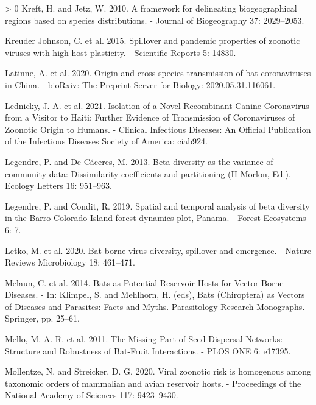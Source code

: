 \documentclass[11pt]{article}
\newlength{\cslhangindent}
\newenvironment{CSLReferences}[3] %
 {%
  \setlength{\parindent}{0pt}
  \ifodd #1 \everypar{\setlength{\hangindent}{\cslhangindent}}\ignorespaces\fi
  \ifnum #2 > 0
  \setlength{\parskip}{#2\baselineskip}
  \fi
 }%
 {}
\begin{document}
\begin{CSLReferences}{1}{0}
\leavevmode\hypertarget{ref-Kreft2010FraDel}{}%
Kreft, H. and Jetz, W. 2010. A framework for delineating biogeographical
regions based on species distributions. - Journal of Biogeography 37:
2029--2053.

\leavevmode\hypertarget{ref-KreuderJohnson2015SpiPan}{}%
Kreuder Johnson, C. et al. 2015. Spillover and pandemic properties of
zoonotic viruses with high host plasticity. - Scientific Reports 5:
14830.

\leavevmode\hypertarget{ref-Latinne2020OriCro}{}%
Latinne, A. et al. 2020. Origin and cross-species transmission of bat
coronaviruses in China. - bioRxiv: The Preprint Server for Biology:
2020.05.31.116061.

\leavevmode\hypertarget{ref-Lednicky2021IsoNov}{}%
Lednicky, J. A. et al. 2021. Isolation of a Novel Recombinant Canine
Coronavirus from a Visitor to Haiti: Further Evidence of Transmission of
Coronaviruses of Zoonotic Origin to Humans. - Clinical Infectious
Diseases: An Official Publication of the Infectious Diseases Society of
America: ciab924.

\leavevmode\hypertarget{ref-Legendre2013BetDiv}{}%
Legendre, P. and De Cáceres, M. 2013. Beta diversity as the variance of
community data: Dissimilarity coefficients and partitioning (H Morlon,
Ed.). - Ecology Letters 16: 951--963.

\leavevmode\hypertarget{ref-Legendre2019SpaTem}{}%
Legendre, P. and Condit, R. 2019. Spatial and temporal analysis of beta
diversity in the Barro Colorado Island forest dynamics plot, Panama. -
Forest Ecosystems 6: 7.

\leavevmode\hypertarget{ref-Letko2020BatVir}{}%
Letko, M. et al. 2020. Bat-borne virus diversity, spillover and
emergence. - Nature Reviews Microbiology 18: 461--471.

\leavevmode\hypertarget{ref-Melaun2014BatPot}{}%
Melaun, C. et al. 2014. Bats as Potential Reservoir Hosts for
Vector-Borne Diseases. - In: Klimpel, S. and Mehlhorn, H. (eds), Bats
(Chiroptera) as Vectors of Diseases and Parasites: Facts and Myths.
Parasitology Research Monographs. Springer, pp. 25--61.

\leavevmode\hypertarget{ref-Mello2011MisPar}{}%
Mello, M. A. R. et al. 2011. The Missing Part of Seed Dispersal
Networks: Structure and Robustness of Bat-Fruit Interactions. - PLOS ONE
6: e17395.

\leavevmode\hypertarget{ref-Mollentze2020VirZoo}{}%
Mollentze, N. and Streicker, D. G. 2020. Viral zoonotic risk is
homogenous among taxonomic orders of mammalian and avian reservoir
hosts. - Proceedings of the National Academy of Sciences 117:
9423--9430.


\end{CSLReferences}
\end{document}
